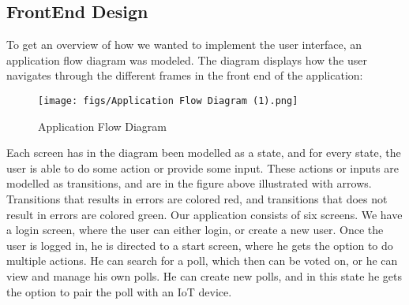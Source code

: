 \subsection{FrontEnd Design} 
To get an overview of how we wanted to implement the user interface, an application flow diagram was modeled. 
The diagram displays how the user navigates through the different frames in the front end of the application: \\

\begin{figure}[h]
  \centering
  \texttt{[image: figs/Application Flow Diagram (1).png]}
  \caption{Application Flow Diagram}
  \label{fig:appFlow}
\end{figure}


\noindent Each screen has in the diagram been modelled as a state, and for every state, the user is able to do some action or provide some input. 
These actions or inputs are modelled as transitions, and are in the figure above illustrated with arrows. Transitions that results in errors are 
colored red, and transitions that does not result in errors are colored green. Our application consists of six screens. We have a login screen, 
where the user can either login, or create a new user. Once the user is logged in, he is directed to a start screen, where he gets the option to 
do multiple actions. He can search for a poll, which then can be voted on, or he can view and manage his own polls. He can create new polls,
and in this state he gets the option to pair the poll with an IoT device. \\
